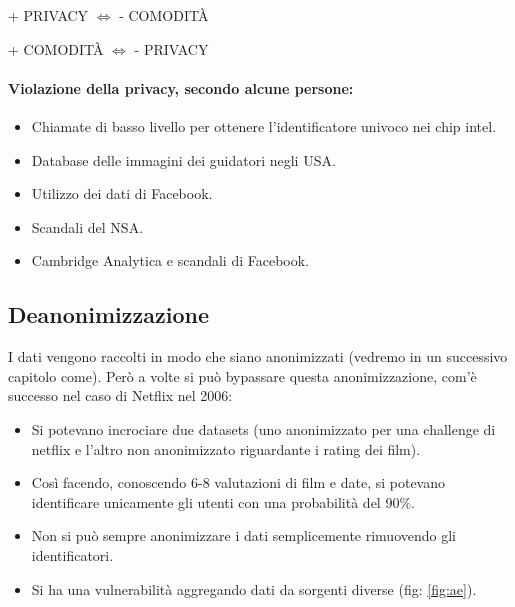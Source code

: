 \begin{center}
+ PRIVACY $\Leftrightarrow$ - COMODITÀ

  + COMODITÀ $\Leftrightarrow$ - PRIVACY
\end{center}


\paragraph{Violazione della privacy, secondo alcune persone:}

\begin{itemize}
  \item Chiamate di basso livello per ottenere l'identificatore univoco nei chip intel. 
    \item Database delle immagini dei guidatori negli USA. 
    \item Utilizzo dei dati di Facebook. 
    \item Scandali del NSA. 
    \item Cambridge Analytica e scandali di Facebook.
\end{itemize}




\subsection{Deanonimizzazione}

I dati vengono raccolti in modo che siano anonimizzati (vedremo in un successivo capitolo come). Però a volte si può bypassare questa anonimizzazione, com'è successo nel caso di Netflix nel 2006:

\begin{itemize}
  \item Si potevano incrociare due datasets (uno anonimizzato per una challenge di netflix e l'altro non anonimizzato riguardante i rating dei film). 
  \item Così facendo, conoscendo 6-8 valutazioni di film e date, si potevano identificare unicamente gli utenti con una probabilità del 90\%. 
  \item Non si può sempre anonimizzare i dati semplicemente rimuovendo gli identificatori. 
  \item Si ha una vulnerabilità aggregando dati da sorgenti diverse (fig: \ref{fig:ae}).
\end{itemize}

